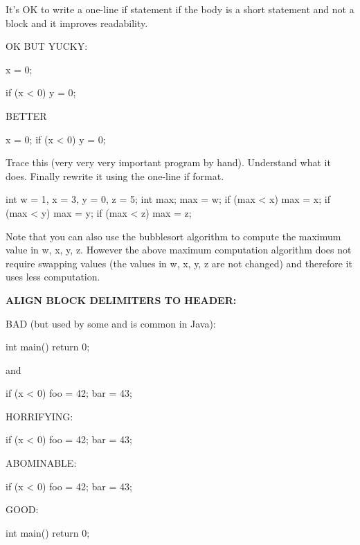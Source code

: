 It's OK to write a one-line if statement if the body is
a short statement and not a block and it improves readability.

OK BUT YUCKY:
\begin{console}
x = 0;

if (x < 0)
    y = 0; 
\end{console}

BETTER
\begin{console}
x = 0;
if (x < 0) y = 0; 
\end{console}

\newpage{}

Trace this (very very very important program by hand). Understand what
it does. Finally rewrite it using the one-line if format.\\
\begin{console}
int w = 1, x = 3, y = 0, z = 5;
int max;
max = w;
if (max < x)
   max = x;
if (max < y)
   max = y;
if (max < z)
   max = z; 
\end{console}

Note that you can also use the bubblesort algorithm to compute the
maximum value in w, x, y, z. However the above maximum computation
algorithm does not require swapping values (the values in w, x, y, z are
not changed) and therefore it uses less computation.


\newpage{}

\textbf{ALIGN BLOCK DELIMITERS TO HEADER:}

BAD (but used by some and is common in Java):
\begin{console}
int main() {
    return 0;
}  
\end{console}
and\\
\begin{console}
if (x < 0) {
   foo = 42;
   bar = 43;
} 
\end{console}

HORRIFYING:\\
\begin{console}
if (x < 0)
   {
   foo = 42;
   bar = 43;
   } 
\end{console}

ABOMINABLE:
\begin{console}
if (x < 0)
   {
        foo = 42;
        bar = 43;
   } 
\end{console}

GOOD:
\begin{console}
int main()
{
    return 0;
}  
\end{console}

